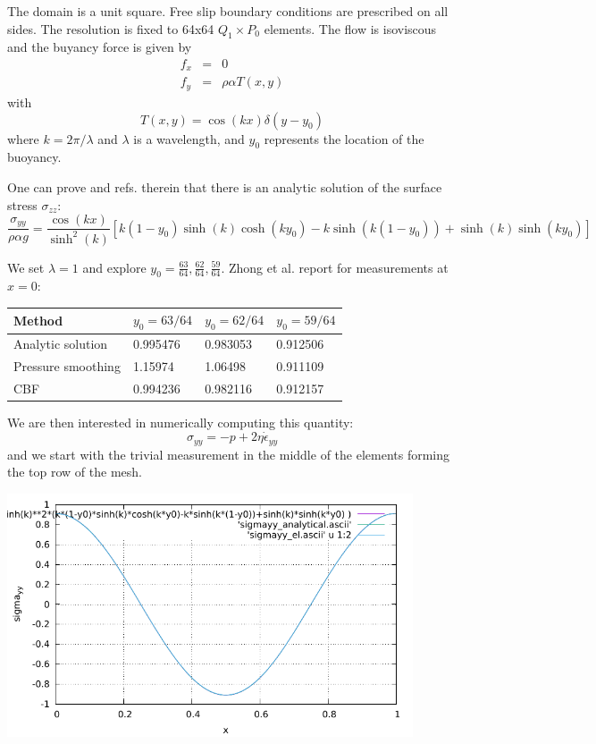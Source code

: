 The domain is a unit square. Free slip 
boundary conditions are prescribed on all sides.
The resolution is fixed to 64x64 $Q_1 \times P_0$ elements. 
The flow is isoviscous and the buyancy force is given by 
\begin{eqnarray}
f_x &=& 0 \\
f_y &=& \rho \alpha T(x,y) 
\end{eqnarray}
with 
\[
T(x,y) = \cos(kx) \delta(y-y_0)
\]
where $k=2\pi/\lambda$ and $\lambda$ is a wavelength, 
and $y_0$ represents the location of the buoyancy.

One can prove \cite{zhgh93} and refs. therein that 
there is an analytic solution of the surface stress 
$\sigma_{zz}$:
\[
\frac{\sigma_{yy}}{\rho \alpha g} =
\frac{\cos (kx)}{\sinh^2(k)}
\left[
k(1-y_0)\sinh(k) \cosh(ky_0)-k \sinh(k(1-y_0))
+\sinh(k) \sinh(ky_0)
\right]
\]

We set $\lambda=1$ and explore $y_0 = \frac{63}{64},\frac{62}{64},\frac{59}{64}$.
Zhong et al. report for measurements at $x=0$:

\begin{center}
\begin{tabular}{llll}
\hline
Method             & $y_0=63/64$ & $y_0=62/64$ &  $y_0=59/64$ \\ 
\hline
\hline
Analytic solution  & 0.995476    & 0.983053    &  0.912506 \\
Pressure smoothing & 1.15974     & 1.06498     &  0.911109 \\
CBF                & 0.994236    & 0.982116    &  0.912157 \\
\hline
\end{tabular}
\end{center}


We are then interested in numerically computing this quantity:
\[
\sigma_{yy} = -p + 2 \eta \dot{\epsilon}_{yy}
\]
and we start with the trivial measurement in the middle of the elements 
forming the top row of the mesh. 

\includegraphics[width=12cm]{python_codes/fieldstone_27/results/elemental/sigmazz.pdf}






